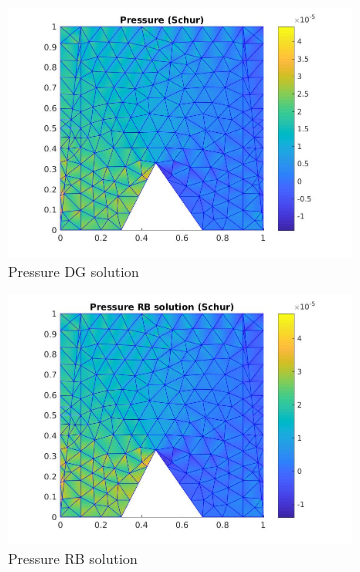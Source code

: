 \documentclass[graybox]{svmult}
\begin{document}
\begin{figure}
\begin{subfigure}{0.31\textwidth}
\includegraphics[width=\linewidth]{offline_pressure_at_47_33.jpg}
\caption{Pressure DG solution} \label{pre_dg}
\end{subfigure}\hspace*{\fill}
\begin{subfigure}{0.31\textwidth}
\includegraphics[width=\linewidth]{online_pressure_at_47_33.jpg}
\caption{Pressure RB solution} \label{pre_rb}
\end{subfigure}
\begin{subfigure}{0.31\textwidth}

\end{subfigure}
\end{figure}
\end{document}
